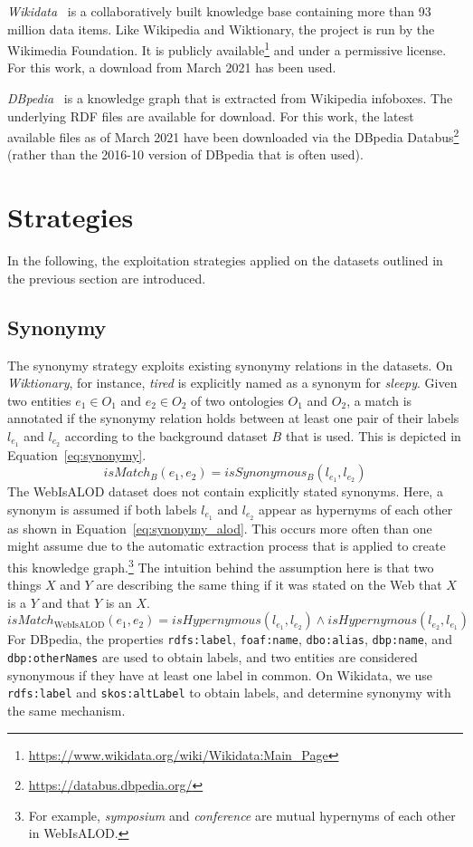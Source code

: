 \documentclass[runningheads]{llncs}
\begin{document}
\emph{Wikidata}~\cite{vrandevcic2014wikidata} is a collaboratively built knowledge base containing more than 93 million data items. Like Wikipedia and Wiktionary, the project is run by the Wikimedia Foundation.
It is publicly available\footnote{\url{https://www.wikidata.org/wiki/Wikidata:Main_Page}} and under a permissive license. For this work, a download from March 2021 has been used.

\emph{DBpedia}~\cite{dbpedia} is a knowledge graph that is extracted from Wikipedia infoboxes. The underlying RDF files are available for download. For this work, the latest available files as of March 2021 have been downloaded via the DBpedia Databus\footnote{\url{https://databus.dbpedia.org/}} (rather than the 2016-10 version of DBpedia that is often used).

\section{Strategies}
\label{sec:strategies}
In the following, the exploitation strategies applied on the datasets outlined in the previous section are introduced.


\subsection{Synonymy}
\label{ssec:synonymy_strategy}
The synonymy strategy exploits existing synonymy relations in the datasets. On \textit{Wiktionary}, for instance, \textit{tired} is explicitly named as a synonym for \textit{sleepy}. 
Given two entities $e_1 \in O_1$ and $e_2 \in O_2$ of two ontologies $O_1$ and $O_2$, a match is annotated if the synonymy relation holds between at least one pair of their labels $l_{e_1}$ and $l_{e_2}$ according to the background dataset $B$ that is used. This is depicted in Equation~\ref{eq:synonymy}.
\begin{equation}
    isMatch_B(e_1, e_2) = isSynonymous_B(l_{e_1}, l_{e_2})
\label{eq:synonymy}
\end{equation}
The WebIsALOD dataset does not contain explicitly stated synonyms. Here, a synonym is assumed if both labels $l_{e_1}$ and $l_{e_2}$ appear as hypernyms of each other as shown in Equation~\ref{eq:synonymy_alod}. This occurs more often than one might assume due to the automatic extraction process that is applied to create this knowledge graph.\footnote{For example, \emph{symposium} and \emph{conference} are mutual hypernyms of each other in WebIsALOD.} The intuition behind the assumption here is that two things $X$ and $Y$ are describing the same thing if it was stated on the Web that $X$ is a $Y$ and that $Y$ is an $X$.
\begin{equation}
    isMatch_\text{WebIsALOD}(e_1, e_2) = isHypernymous(l_{e_1}, l_{e_2}) \land isHypernymous(l_{e_2}, l_{e_1})
\label{eq:synonymy_alod}
\end{equation}
For DBpedia, the properties \texttt{rdfs:label}, \texttt{foaf:name}, \texttt{dbo:alias}, \texttt{dbp:name}, and \texttt{dbp:otherNames} are used to obtain labels, and two entities are considered synonymous if they have at least one label in common. On Wikidata, we use \texttt{rdfs:label} and \texttt{skos:altLabel} to obtain labels, and determine synonymy with the same mechanism.
\end{document}
